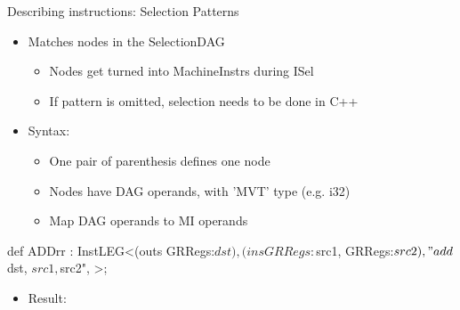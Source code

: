 \begin{frame}[fragile]{Describing instructions: Selection Patterns}

\begin{itemize}
    \item Matches nodes in the SelectionDAG
    \begin{itemize}
        \item Nodes get turned into MachineInstrs during ISel
        \item If pattern is omitted, selection needs to be done in C++
    \end{itemize}
    \item Syntax:
    \begin{itemize}
        \item One pair of parenthesis defines one node
        \item Nodes have DAG operands, with 'MVT' type (e.g. i32)
        \item Map DAG operands to MI operands
    \end{itemize}
\end{itemize}

\begin{codebox}[commandchars=\\\{\}]
def ADDrr : InstLEG<(outs GRRegs:$dst),
                    (ins GRRegs:$src1, GRRegs:$src2),
                    "add $dst, $src1, $src2",
                    >;
\end{codebox}

\vspace{5ex}
\begin{itemize}
    \item Result:
\end{itemize}

\end{frame}


